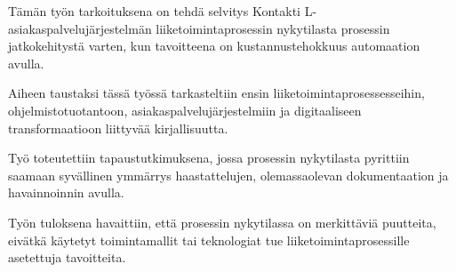 \documentclass[finnish,12pt,a4paper,pdftex]{article}
\begin{document}


\makecoverpage


\begin{abstractpage}[finnish]
 
Tämän työn tarkoituksena on tehdä selvitys Kontakti L-asiakaspalvelujärjestelmän liiketoimintaprosessin nykytilasta prosessin jatkokehitystä varten, kun tavoitteena on kustannustehokkuus automaation avulla.

Aiheen taustaksi tässä työssä tarkasteltiin ensin liiketoimintaprosessesseihin, ohjelmistotuotantoon, asiakaspalvelujärjestelmiin ja digitaaliseen transformaatioon liittyvää kirjallisuutta.

Työ toteutettiin tapaustutkimuksena, jossa prosessin nykytilasta pyrittiin saamaan syvällinen ymmärrys haastattelujen, olemassaolevan dokumentaation ja havainnoinnin avulla. 

Työn tuloksena havaittiin, että prosessin nykytilassa on merkittäviä puutteita, eivätkä käytetyt toimintamallit tai teknologiat tue liiketoimintaprosessille asetettuja tavoitteita. \end{abstractpage}
\end{document}
